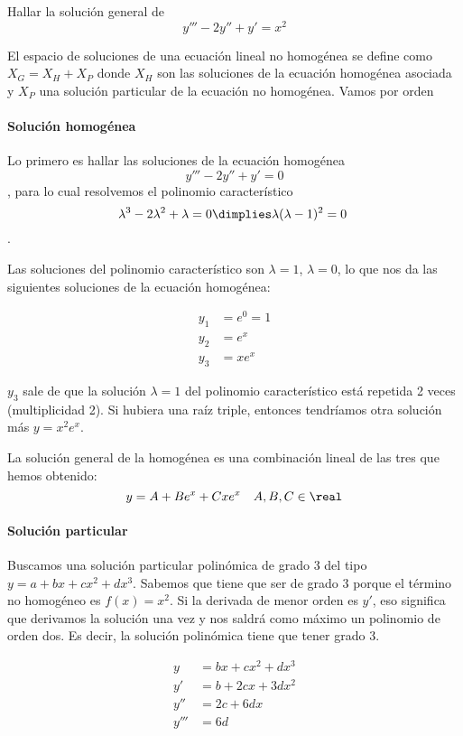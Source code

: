 \documentclass[nochap]{apuntes}
\begin{document}
\begin{problem}[9] Hallar la solución general de
\[ y'''-2y''+y' = x^2 \]
\solution

El espacio de soluciones de una ecuación lineal no homogénea se define como $X_G = X_H + X_P$ donde $X_H$ son las soluciones de la ecuación homogénea asociada y $X_P$ una solución particular de la ecuación no homogénea. Vamos por orden

\paragraph{Solución homogénea} Lo primero es hallar las soluciones de la ecuación homogénea \[y'''-2y''+y' = 0 \], para lo cual resolvemos el polinomio característico \[ \lambda^3 - 2\lambda^2 + \lambda = 0 \dimplies \lambda(\lambda-1)^2 = 0 \].

Las soluciones del polinomio característico son $λ=1$, $λ=0$, lo que nos da las siguientes soluciones de la ecuación homogénea:

\begin{align*}
y_1 &= e^0 = 1 \\
y_2 &= e^x\\
y_3 &= xe^x
\end{align*}

$y_3$ sale de que la solución $λ=1$ del polinomio característico está repetida 2 veces (multiplicidad 2). Si hubiera una raíz triple, entonces tendríamos otra solución más $y = x^2e^x$.

La solución general de la homogénea es una combinación lineal de las tres que hemos obtenido:
\[ y = A + Be^x +  C xe^x\quad A,B,C\in\real \]

\paragraph{Solución particular} Buscamos una solución particular polinómica de grado 3 del tipo $y=a+bx+cx^2+dx^3$. Sabemos que tiene que ser de grado 3 porque el término no homogéneo es $f(x) = x^2$. Si la derivada de menor orden es $y'$, eso significa que derivamos la solución una vez y nos saldrá como máximo un polinomio de orden dos. Es decir, la solución polinómica tiene que tener grado 3.

\begin{align*}
y &= bx+cx^2+dx^3\\
y' &= b+2cx+3dx^2\\
y'' &= 2c + 6dx\\
y''' &= 6d
\end{align*}


\end{problem}
\end{document}
